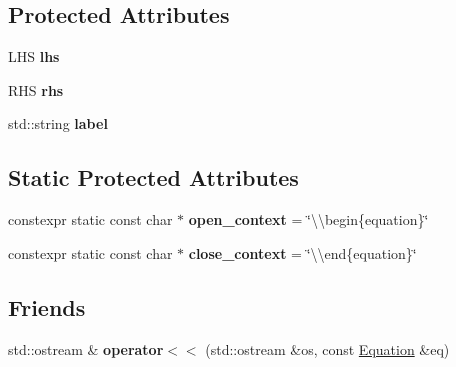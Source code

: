 \subsection*{Protected Attributes}
\begin{DoxyCompactItemize}
\item 
\hypertarget{classlatex_1_1math_1_1Equation_a8e2395207a86cc6fda70df7e31ca004f}{L\-H\-S {\bfseries lhs}}\label{classlatex_1_1math_1_1Equation_a8e2395207a86cc6fda70df7e31ca004f}

\item 
\hypertarget{classlatex_1_1math_1_1Equation_aacaf6103dff8138d0e6836def99dea50}{R\-H\-S {\bfseries rhs}}\label{classlatex_1_1math_1_1Equation_aacaf6103dff8138d0e6836def99dea50}

\item 
\hypertarget{classlatex_1_1math_1_1Equation_af90f3dae754e6f4dbd5e44c0e45a14f5}{std\-::string {\bfseries label}}\label{classlatex_1_1math_1_1Equation_af90f3dae754e6f4dbd5e44c0e45a14f5}

\end{DoxyCompactItemize}
\subsection*{Static Protected Attributes}
\begin{DoxyCompactItemize}
\item 
\hypertarget{classlatex_1_1math_1_1Equation_a9e5c1cbd1b860d6ceff91858cf5f25f1}{constexpr static const char $\ast$ {\bfseries open\-\_\-context} = \char`\"{}\textbackslash{}\textbackslash{}begin\{equation\}\char`\"{}}\label{classlatex_1_1math_1_1Equation_a9e5c1cbd1b860d6ceff91858cf5f25f1}

\item 
\hypertarget{classlatex_1_1math_1_1Equation_aea651eda97f201333c0089cd15e5a339}{constexpr static const char $\ast$ {\bfseries close\-\_\-context} = \char`\"{}\textbackslash{}\textbackslash{}end\{equation\}\char`\"{}}\label{classlatex_1_1math_1_1Equation_aea651eda97f201333c0089cd15e5a339}

\end{DoxyCompactItemize}
\subsection*{Friends}
\begin{DoxyCompactItemize}
\item 
\hypertarget{classlatex_1_1math_1_1Equation_af5648da26fb4c842581cc55ebd721494}{std\-::ostream \& {\bfseries operator$<$$<$} (std\-::ostream \&os, const \hyperlink{classlatex_1_1math_1_1Equation}{Equation} \&eq)}\label{classlatex_1_1math_1_1Equation_af5648da26fb4c842581cc55ebd721494}

\end{DoxyCompactItemize}


